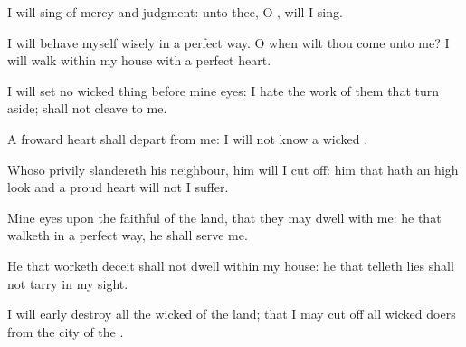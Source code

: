 {\Q {}I will
sing of
mercy and
judgment: unto thee, O
{}, will I
sing.


\par }{\Q {}I will behave myself
wisely in a
perfect
way. O when wilt thou
come unto me? I will
walk
within my
house with a
perfect
heart.


\par }{\Q {}I will
set no
wicked
thing before mine
eyes: I
hate the
work of them that turn
aside;
{} shall not
cleave to me.


\par }{\Q {}A
froward
heart shall
depart from me: I will not
know a
wicked
{}.


\par }{\Q {}Whoso
privily
slandereth his
neighbour, him will I cut
off: him that hath an
high
look and a
proud
heart will not I
suffer.


\par }{\Q {}Mine
eyes
{} upon the
faithful of the
land, that they may
dwell with me: he that
walketh in a
perfect
way, he shall
serve me.


\par }{\Q {}He that
worketh
deceit shall not
dwell
within my
house: he that
telleth
lies shall not
tarry in my
sight.


\par }{\Q {}I will
early
destroy all the
wicked of the
land; that I may cut
off all
wicked
doers from the
city of the
{}.




\par }

